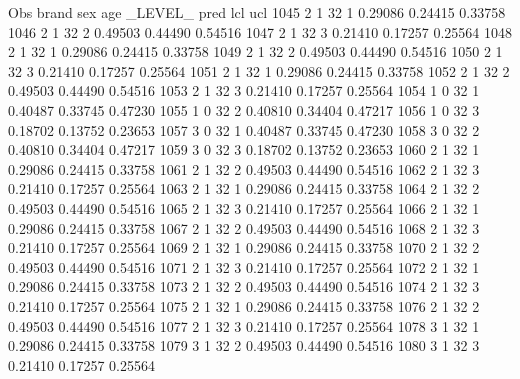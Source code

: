 \documentclass{article}
\begin{document}
\begin{Woutput}
 Obs    brand    sex    age    _LEVEL_      pred       lcl        ucl
1045      2       1      32       1       0.29086    0.24415    0.33758
1046      2       1      32       2       0.49503    0.44490    0.54516
1047      2       1      32       3       0.21410    0.17257    0.25564
1048      2       1      32       1       0.29086    0.24415    0.33758
1049      2       1      32       2       0.49503    0.44490    0.54516
1050      2       1      32       3       0.21410    0.17257    0.25564
1051      2       1      32       1       0.29086    0.24415    0.33758
1052      2       1      32       2       0.49503    0.44490    0.54516
1053      2       1      32       3       0.21410    0.17257    0.25564
1054      1       0      32       1       0.40487    0.33745    0.47230
1055      1       0      32       2       0.40810    0.34404    0.47217
1056      1       0      32       3       0.18702    0.13752    0.23653
1057      3       0      32       1       0.40487    0.33745    0.47230
1058      3       0      32       2       0.40810    0.34404    0.47217
1059      3       0      32       3       0.18702    0.13752    0.23653
1060      2       1      32       1       0.29086    0.24415    0.33758
1061      2       1      32       2       0.49503    0.44490    0.54516
1062      2       1      32       3       0.21410    0.17257    0.25564
1063      2       1      32       1       0.29086    0.24415    0.33758
1064      2       1      32       2       0.49503    0.44490    0.54516
1065      2       1      32       3       0.21410    0.17257    0.25564
1066      2       1      32       1       0.29086    0.24415    0.33758
1067      2       1      32       2       0.49503    0.44490    0.54516
1068      2       1      32       3       0.21410    0.17257    0.25564
1069      2       1      32       1       0.29086    0.24415    0.33758
1070      2       1      32       2       0.49503    0.44490    0.54516
1071      2       1      32       3       0.21410    0.17257    0.25564
1072      2       1      32       1       0.29086    0.24415    0.33758
1073      2       1      32       2       0.49503    0.44490    0.54516
1074      2       1      32       3       0.21410    0.17257    0.25564
1075      2       1      32       1       0.29086    0.24415    0.33758
1076      2       1      32       2       0.49503    0.44490    0.54516
1077      2       1      32       3       0.21410    0.17257    0.25564
1078      3       1      32       1       0.29086    0.24415    0.33758
1079      3       1      32       2       0.49503    0.44490    0.54516
1080      3       1      32       3       0.21410    0.17257    0.25564

\end{Woutput}
\end{document}
